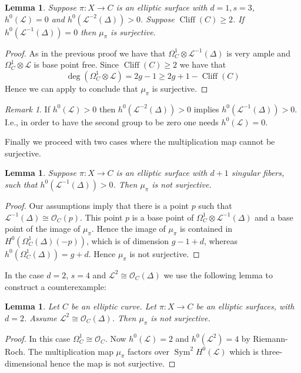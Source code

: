 \documentclass{amsart}
\newcommand{\cL}{\mathcal{L}}
\newcommand{\cO}{\mathcal{O}}
\newtheorem{lemma}[theorem]{Lemma}
\theoremstyle{definition}
\theoremstyle{remark}
\newtheorem{remark}[theorem]{Remark}
\DeclareMathOperator{\Sym}{Sym}
\DeclareMathOperator{\Cliff}{Cliff}
\begin{document}
\begin{lemma}  \label{lemKosVanD} Suppose $\pi: X\to C$ is an elliptic surface with $d=1, s=3$, $h^0(\cL)=0$ and $h^0(\cL^{-2}(\Delta))>0$. 
Suppose $\Cliff(C)\geq 2$. 
If $h^0(\cL^{-1}(\Delta))=0$   then $\mu_\pi$ is surjective.
\end{lemma}

\begin{proof}
As in the previous proof we have that $\Omega_C^1\otimes \cL^{-1}(\Delta)$ is very ample and $\Omega_C^1\otimes \cL$ is base point free.
Since $\Cliff(C)\geq 2$ we have that 
\[ \deg(\Omega_C^1\otimes \cL)=2g-1\geq 2g+1-\Cliff(C)\]
Hence we can apply \cite[Theorem 1]{ButMult} to conclude that $\mu_\pi$ is surjective.
\end{proof}

\begin{remark} If $h^0(\cL)>0$ then $h^0(\cL^{-2}(\Delta))>0$ implies $h^0(\cL^{-1}(\Delta))>0$. I.e., in order to have the second group to be zero one needs $h^0(\cL)=0$.
\end{remark}

Finally we proceed with two cases where the multiplication map cannot be surjective.

\begin{lemma} \label{lemKosNonVanA}Suppose $\pi:X\to C$ is an elliptic surface with $d+1$ singular fibers, such that $h^0(\cL^{-1}(\Delta))>0$. Then  $\mu_\pi$ is not surjective.
\end{lemma}

\begin{proof}
Our assumptions imply that there is a point $p$ such that $\cL^{-1}(\Delta)\cong \cO_C(p)$. This point $p$ is a base point of $\Omega^1_C\otimes \cL^{-1}(\Delta)$ and a base point of the image of $\mu_\pi$.
Hence the image of $\mu_\pi$ is contained in $H^0(\Omega^1_C(\Delta)(-p))$, which is of dimension $g-1+d$, whereas $h^0(\Omega^1_C(\Delta))=g+d$. Hence $\mu_\pi$ is not surjective. 
\end{proof}



In the case $d=2$, $s=4$ and $\cL^2\cong \cO_C(\Delta)$ we use the following lemma to construct a counterexample:
\begin{lemma} 
\label{lemKosNonVanB} Let $C$ be an elliptic curve. Let $\pi: X \to C$ be an elliptic surfaces, with $d=2$. Assume $\cL^{2}\cong \cO_C(\Delta)$. Then $\mu_\pi$
is not surjective.
\end{lemma}

\begin{proof} In this case $\Omega^1_C\cong \cO_C$. Now $h^0(\cL)=2$ and $h^0(\cL^2)=4$ by Riemann-Roch. The multiplication map $\mu_\pi$ factors over $\Sym^2 H^0(\cL)$ which is three-dimensional hence the map is not surjective.
\end{proof}
\end{document}
